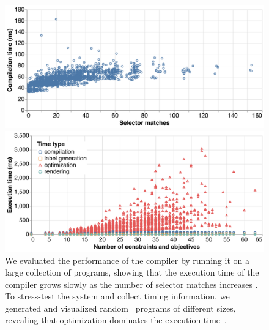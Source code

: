 \begin{figure}
  \centering
  \begin{minipage}[c]{.48\linewidth}
      \includegraphics[width=\linewidth]{assets/penrose/compilation-graph.pdf}
  \end{minipage}
  \begin{minipage}[c]{.48\linewidth}
      \includegraphics[width=\linewidth]{assets/penrose/optimization-graph.pdf}
  \end{minipage}
  \caption{We evaluated the performance of the \Penrose{} compiler by running it on a large collection of programs, showing that the execution time of the compiler grows slowly as the number of selector matches increases . To stress-test the system and collect timing information, we generated and visualized random \Substance\ programs of different sizes, revealing that optimization dominates the execution time~.}
  \label{fig:penrose-performance}
\end{figure}

